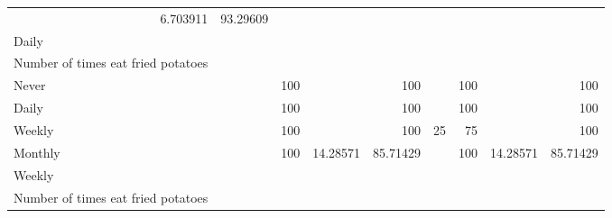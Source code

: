 \documentclass{article}
\begin{document}
\begin{tabular}{lllllllll}
  \multicolumn{1}{r}{6.703911} &
  \multicolumn{1}{r}{93.29609} \\
\multicolumn{1}{l}{\hspace{3em}Daily} &
  \multicolumn{1}{|r}{} &
  \multicolumn{1}{r}{} &
  \multicolumn{1}{r}{} &
  \multicolumn{1}{r}{} &
  \multicolumn{1}{r}{} &
  \multicolumn{1}{r}{} &
  \multicolumn{1}{r}{} &
  \multicolumn{1}{r}{} \\
\multicolumn{1}{l}{\hspace{4em}Number of times eat fried potatoes} &
  \multicolumn{1}{|r}{} &
  \multicolumn{1}{r}{} &
  \multicolumn{1}{r}{} &
  \multicolumn{1}{r}{} &
  \multicolumn{1}{r}{} &
  \multicolumn{1}{r}{} &
  \multicolumn{1}{r}{} &
  \multicolumn{1}{r}{} \\
\multicolumn{1}{l}{\hspace{5em}Never} &
  \multicolumn{1}{|r}{} &
  \multicolumn{1}{r}{100} &
  \multicolumn{1}{r}{} &
  \multicolumn{1}{r}{100} &
  \multicolumn{1}{r}{} &
  \multicolumn{1}{r}{100} &
  \multicolumn{1}{r}{} &
  \multicolumn{1}{r}{100} \\
\multicolumn{1}{l}{\hspace{5em}Daily} &
  \multicolumn{1}{|r}{} &
  \multicolumn{1}{r}{100} &
  \multicolumn{1}{r}{} &
  \multicolumn{1}{r}{100} &
  \multicolumn{1}{r}{} &
  \multicolumn{1}{r}{100} &
  \multicolumn{1}{r}{} &
  \multicolumn{1}{r}{100} \\
\multicolumn{1}{l}{\hspace{5em}Weekly} &
  \multicolumn{1}{|r}{} &
  \multicolumn{1}{r}{100} &
  \multicolumn{1}{r}{} &
  \multicolumn{1}{r}{100} &
  \multicolumn{1}{r}{25} &
  \multicolumn{1}{r}{75} &
  \multicolumn{1}{r}{} &
  \multicolumn{1}{r}{100} \\
\multicolumn{1}{l}{\hspace{5em}Monthly} &
  \multicolumn{1}{|r}{} &
  \multicolumn{1}{r}{100} &
  \multicolumn{1}{r}{14.28571} &
  \multicolumn{1}{r}{85.71429} &
  \multicolumn{1}{r}{} &
  \multicolumn{1}{r}{100} &
  \multicolumn{1}{r}{14.28571} &
  \multicolumn{1}{r}{85.71429} \\
\multicolumn{1}{l}{\hspace{3em}Weekly} &
  \multicolumn{1}{|r}{} &
  \multicolumn{1}{r}{} &
  \multicolumn{1}{r}{} &
  \multicolumn{1}{r}{} &
  \multicolumn{1}{r}{} &
  \multicolumn{1}{r}{} &
  \multicolumn{1}{r}{} &
  \multicolumn{1}{r}{} \\
\multicolumn{1}{l}{\hspace{4em}Number of times eat fried potatoes} &
  \multicolumn{1}{|r}{} &

\end{tabular}
\end{document}
